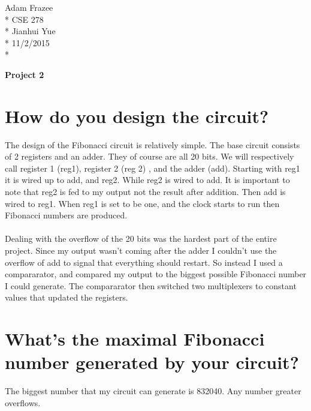 \documentclass{article}
\begin{document}
	\begin{flushleft}
		Adam Frazee \\*
		CSE 278\\*
		Jianhui Yue\\*
		11/2/2015\\*
	\end{flushleft}
		\begin{center}
		\LARGE{\textbf{Project 2}}
	\end{center}
	\section{How do you design the circuit?}
	The design of the Fibonacci circuit is relatively simple. The base circuit consists of 2 registers and an adder. They of course are all 20 bits. We will respectively call register 1 (reg1), register 2 (reg 2) , and the adder (add). Starting with reg1 it is wired up to add, and reg2. While reg2 is wired to add. It is important to note that reg2 is fed to my output not the result after addition. Then add is wired to reg1. When reg1 is set to be one, and the clock starts to run then Fibonacci numbers are produced. \\ \\
	Dealing with the overflow of the 20 bits was the hardest part of the entire project. Since my output wasn't coming after the adder I couldn't use the overflow of add to signal that everything should restart. So instead I used a compararator, and compared my output to the biggest possible Fibonacci number I could generate. The compararator then switched two multiplexers to constant values that updated the registers.  
	\section{What's the maximal Fibonacci  number generated by your circuit?}
	The biggest number that my circuit can generate is 832040. Any number greater overflows. 
\end{document}
